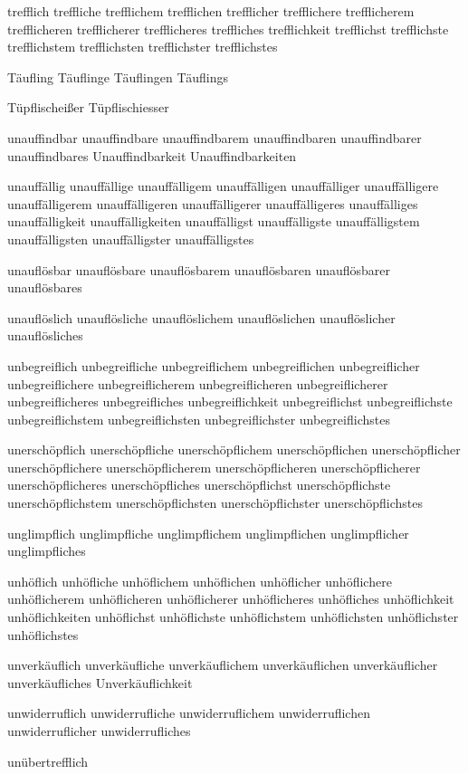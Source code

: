 trefflich treffliche trefflichem trefflichen trefflicher trefflichere trefflicherem trefflicheren trefflicherer trefflicheres treffliches trefflichkeit trefflichst trefflichste trefflichstem trefflichsten trefflichster trefflichstes

Täufling Täuflinge Täuflingen Täuflings

Tüpflischeißer Tüpflischiesser

unauffindbar unauffindbare unauffindbarem unauffindbaren unauffindbarer unauffindbares Unauffindbarkeit Unauffindbarkeiten

unauffällig unauffällige unauffälligem unauffälligen unauffälliger unauffälligere unauffälligerem unauffälligeren unauffälligerer unauffälligeres unauffälliges unauffälligkeit unauffälligkeiten unauffälligst unauffälligste unauffälligstem unauffälligsten unauffälligster unauffälligstes

unauflösbar unauflösbare unauflösbarem unauflösbaren unauflösbarer unauflösbares

unauflöslich unauflösliche unauflöslichem unauflöslichen unauflöslicher unauflösliches

unbegreiflich unbegreifliche unbegreiflichem unbegreiflichen unbegreiflicher unbegreiflichere unbegreiflicherem unbegreiflicheren unbegreiflicherer unbegreiflicheres unbegreifliches unbegreiflichkeit unbegreiflichst unbegreiflichste unbegreiflichstem unbegreiflichsten unbegreiflichster unbegreiflichstes

unerschöpflich unerschöpfliche unerschöpflichem unerschöpflichen unerschöpflicher unerschöpflichere unerschöpflicherem unerschöpflicheren unerschöpflicherer unerschöpflicheres unerschöpfliches unerschöpflichst unerschöpflichste unerschöpflichstem unerschöpflichsten unerschöpflichster unerschöpflichstes

unglimpflich unglimpfliche unglimpflichem unglimpflichen unglimpflicher unglimpfliches

unhöflich unhöfliche unhöflichem unhöflichen unhöflicher unhöflichere unhöflicherem unhöflicheren unhöflicherer unhöflicheres unhöfliches unhöflichkeit unhöflichkeiten unhöflichst unhöflichste unhöflichstem unhöflichsten unhöflichster unhöflichstes

unverkäuflich unverkäufliche unverkäuflichem unverkäuflichen unverkäuflicher unverkäufliches Unverkäuflichkeit

unwiderruflich unwiderrufliche unwiderruflichem unwiderruflichen unwiderruflicher unwiderrufliches

unübertrefflich

